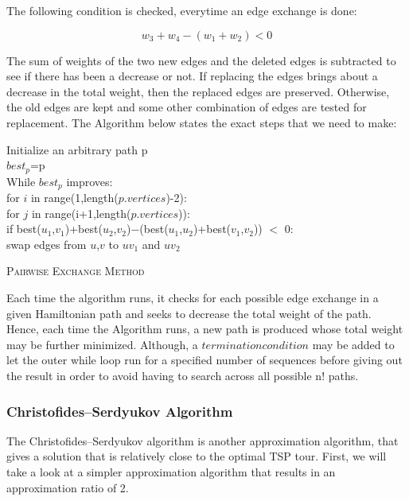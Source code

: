 \documentclass[11pt]{article}
\begin{document}
    The following condition is checked, everytime an edge exchange is done:
    
    \[w_{3}+w_{4} - (w_{1} +w_{2})<0\]
    
    The sum of weights of the two new edges and the deleted edges is subtracted to see if there has been a decrease or not. If replacing the edges brings about a decrease in the total weight, then the replaced edges are preserved. Otherwise, the old edges are kept and some other combination of edges are tested for replacement. The Algorithm below states the exact steps that we need to make:\\
    
    \begin{algorithm*}
        Initialize an arbitrary path p \\
        $best_p$=p \\
        While $best_p$ improves: \\
        for $i$ in range(1,length($p.vertices$)-2): \\
        \quad for $j$ in range(i+1,length($p.vertices$)):\\
        \qquad if best($u_{1}$,$v_{1}$)+best($u_{2}$,$v_{2}$)$-$(best($u_{1}$,$u_{2}$)+best($v_{1}$,$v_{2}$)) $<$ 0:\\
        swap edges from $u$,$v$ to $uv_{1}$ and $uv_{2}$\\
    \caption{\textsc{Pairwise Exchange Method}}
    \end{algorithm*}        
    
    Each time the algorithm runs, it checks for each possible edge exchange in a given Hamiltonian path and seeks to decrease the total weight of the path. Hence, each time the Algorithm runs, a new path is produced whose total weight may be further minimized. Although, a $termination condition$ may be added to let the outer while loop run for a specified number of sequences before giving out the result in order to avoid having to search across all possible n! paths.
    \newpage
    \subsubsection {Christofides–Serdyukov Algorithm}
    The Christofides–Serdyukov algorithm is another approximation algorithm, that gives a solution that is 
    relatively close to the optimal TSP tour. First, we will take a look at a simpler approximation 
    algorithm that results in an approximation ratio of 2.
\end{document}
